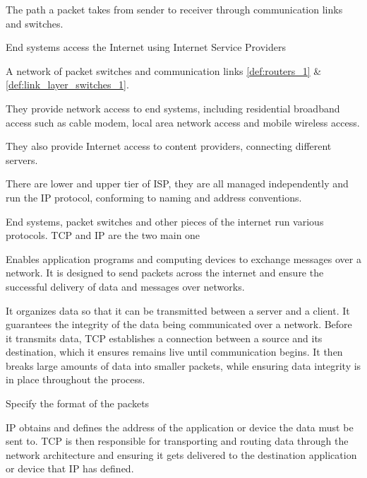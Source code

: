 \begin{definition}\label{def:route_path_1}
    The path a packet takes from sender to receiver through communication links and switches.    
\end{definition}

\newpage

\begin{note}\label{note:end_systems_2}
    End systems access the Internet using Internet Service Providers 
\end{note}


\begin{definition}[isp]\label{def:isp_1}
    A network of packet switches and communication links \ref{def:routers_1} \& \ref{def:link_layer_switches_1}. 
    
    They provide network access to end systems, including residential broadband access such as cable modem, local area network access and mobile wireless access. 

    They also provide Internet access to content providers, connecting different servers. 

    There are lower and upper tier of ISP, they are all managed independently and run the IP protocol, conforming to naming and address conventions.
\end{definition}

\begin{definition*}
    End systems, packet switches and other pieces of the internet run various protocols. TCP and IP are the two main one
    \begin{definition}\label{def:tcp_1}
         Enables application programs and computing devices to exchange messages over a network. It is designed to send packets across the internet and ensure the successful delivery of data and messages over networks.

         It organizes data so that it can be transmitted between a server and a client. It guarantees the integrity of the data being communicated over a network. Before it transmits data, TCP establishes a connection between a source and its destination, which it ensures remains live until communication begins. It then breaks large amounts of data into smaller packets, while ensuring data integrity is in place throughout the process.
    \end{definition}
    \begin{definition}\label{def:IP_1}
        Specify the format of the packets
    \end{definition}

    \begin{note}[differences]\label{note:ip_vs_tcp_1}
        IP obtains and defines the address of the application or device the data must be sent to. TCP is then responsible for transporting and routing data through the network architecture and ensuring it gets delivered to the destination application or device that IP has defined.
    \end{note}
\end{definition*}

